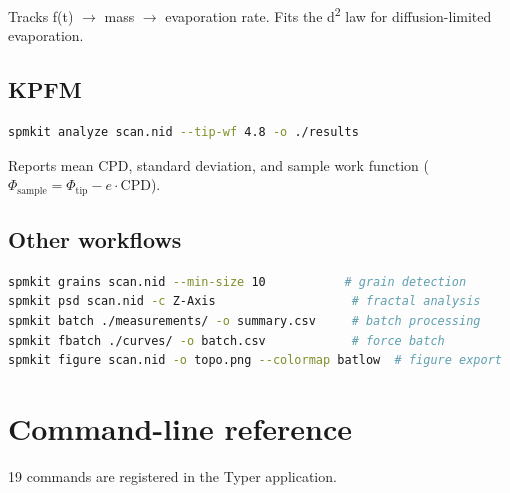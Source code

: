 \documentclass[a4paper,11pt]{article}
\begin{document}
Tracks f(t) $\rightarrow$ mass $\rightarrow$ evaporation rate. Fits the d\textsuperscript{2} law for diffusion-limited evaporation.

\subsection{KPFM}
\begin{lstlisting}[language=bash]
spmkit analyze scan.nid --tip-wf 4.8 -o ./results
\end{lstlisting}

Reports mean CPD, standard deviation, and sample work function
($\Phi_{\text{sample}} = \Phi_{\text{tip}} - e\cdot\text{CPD}$).

\subsection{Other workflows}
\begin{lstlisting}[language=bash]
spmkit grains scan.nid --min-size 10           # grain detection
spmkit psd scan.nid -c Z-Axis                   # fractal analysis
spmkit batch ./measurements/ -o summary.csv     # batch processing
spmkit fbatch ./curves/ -o batch.csv            # force batch
spmkit figure scan.nid -o topo.png --colormap batlow  # figure export
\end{lstlisting}

\section{Command-line reference}

19 commands are registered in the Typer application.
\end{document}
